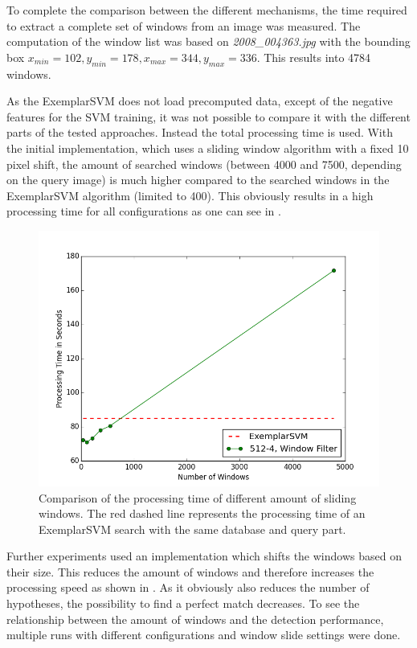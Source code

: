 To complete the comparison between the different mechanisms, the time required to extract a complete set of windows from an image was measured. The computation of the window list was based on \textit{2008\_004363.jpg} with the bounding box $x_{min} = 102, y_{min} = 178, x_{max} = 344, y_{max} = 336$. This results into 4784 windows. %

As the ExemplarSVM does not load precomputed data, except of the negative features for the \ac{SVM} training, it was not possible to compare it with the different parts of the tested approaches. Instead the total processing time is used.
With the initial implementation, which uses a sliding window algorithm with a fixed 10 pixel shift, the amount of searched windows (between 4000 and 7500, depending on the query image) is much higher compared to the searched windows in the ExemplarSVM algorithm (limited to 400). This obviously results in a high processing time for all configurations as one can see in .

\begin{figure}
\centering
\includegraphics[width=0.7\linewidth]{images/window_comparison-512-4-filtered}
\caption[Window comparison]{Comparison of the processing time of different amount of sliding windows. The red dashed line represents the processing time of an ExemplarSVM search with the same database and query part.}
\label{fig:processing_time_windows}
\end{figure}


Further experiments used an implementation which shifts the windows based on their size. This reduces the amount of windows and therefore increases the processing speed as shown in .
As it obviously also reduces the number of hypotheses, the possibility to find a perfect match decreases. To see the relationship between the amount of windows and the detection performance, multiple runs with different configurations and window slide settings were done.

